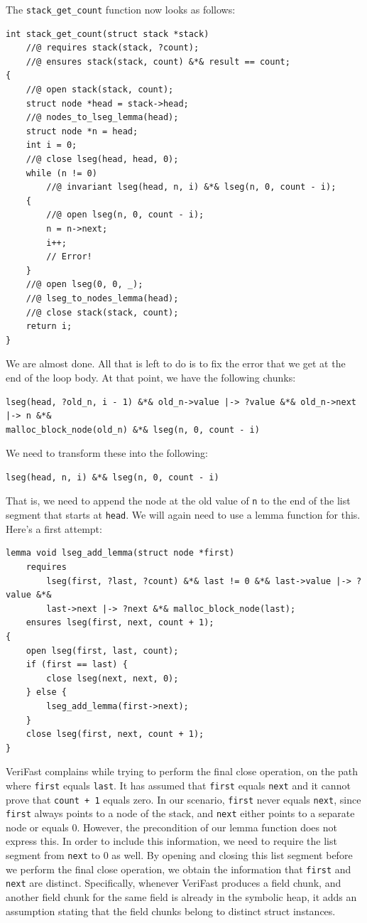 \documentclass{article}
\begin{document}
The \lstinline!stack_get_count! function now looks as follows:
\begin{lstlisting}
int stack_get_count(struct stack *stack)
    //@ requires stack(stack, ?count);
    //@ ensures stack(stack, count) &*& result == count;
{
    //@ open stack(stack, count);
    struct node *head = stack->head;
    //@ nodes_to_lseg_lemma(head);
    struct node *n = head;
    int i = 0;
    //@ close lseg(head, head, 0);
    while (n != 0)
        //@ invariant lseg(head, n, i) &*& lseg(n, 0, count - i);
    {
        //@ open lseg(n, 0, count - i);
        n = n->next;
        i++;
        // Error!
    }
    //@ open lseg(0, 0, _);
    //@ lseg_to_nodes_lemma(head);
    //@ close stack(stack, count);
    return i;
}
\end{lstlisting}
We are almost done. All that is left to do is to fix the error
that we get at the end of the loop body. At that point, we have
the following chunks:
\begin{lstlisting}
lseg(head, ?old_n, i - 1) &*& old_n->value |-> ?value &*& old_n->next |-> n &*&
malloc_block_node(old_n) &*& lseg(n, 0, count - i)
\end{lstlisting}
We need to transform these into the following:
\begin{lstlisting}
lseg(head, n, i) &*& lseg(n, 0, count - i)
\end{lstlisting}
That is, we need to append the node at the old value of
\lstinline!n! to the end of the list segment that starts at
\lstinline!head!. We will again need to use a lemma function
for this. Here's a first attempt:
\begin{lstlisting}
lemma void lseg_add_lemma(struct node *first)
    requires
        lseg(first, ?last, ?count) &*& last != 0 &*& last->value |-> ?value &*&
        last->next |-> ?next &*& malloc_block_node(last);
    ensures lseg(first, next, count + 1);
{
    open lseg(first, last, count);
    if (first == last) {
        close lseg(next, next, 0);
    } else {
        lseg_add_lemma(first->next);
    }
    close lseg(first, next, count + 1);
}
\end{lstlisting}
VeriFast complains while trying to perform the final close
operation, on the path where \lstinline!first! equals
\lstinline!last!. It has assumed that \lstinline!first! equals
\lstinline!next! and it cannot prove that \lstinline!count + 1!
equals zero. In our scenario, \lstinline!first! never equals
\lstinline!next!, since \lstinline!first! always points to a
node of the stack, and \lstinline!next! either points to a
separate node or equals 0. However, the precondition of our
lemma function does not express this. In order to include this
information, we need to require the list segment from
\lstinline!next! to 0 as well. By opening and closing this list
segment before we perform the final close operation, we obtain
the information that \lstinline!first! and \lstinline!next! are
distinct. Specifically, whenever VeriFast produces a field
chunk, and another field chunk for the same field is already in
the symbolic heap, it adds an assumption stating that the field
chunks belong to distinct struct instances.
\end{document}

